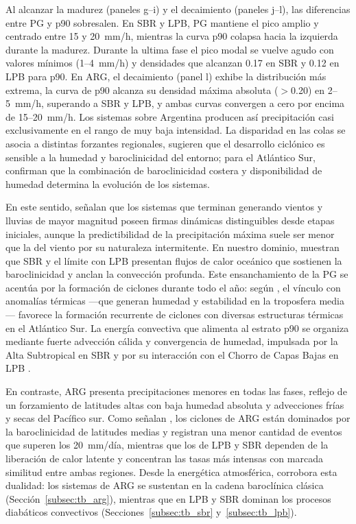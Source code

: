 Al alcanzar la madurez (paneles g--i) y el decaimiento (paneles j--l), las diferencias entre PG y p90 sobresalen. 
En SBR y LPB, PG mantiene el pico amplio y centrado entre 15 y 20~mm/h, mientras la curva p90 colapsa hacia la izquierda durante la madurez. 
Durante la ultima fase el pico modal se vuelve agudo con valores mínimos (1--4~mm/h) y densidades que alcanzan 0.17 en SBR y 0.12 en LPB para p90. 
En ARG, el decaimiento (panel l) exhibe la distribución más extrema, la curva de p90 alcanza su densidad máxima absoluta ($>$0.20) en 2--5~mm/h, superando a SBR y LPB, y ambas curvas convergen a cero por encima de 15--20~mm/h. 
Los sistemas sobre Argentina producen así precipitación casi exclusivamente en el rango de muy baja intensidad.
La disparidad en las colas se asocia a distintas forzantes regionales, \citet{yanase2014parameter} sugieren que el desarrollo ciclónico es sensible a la humedad y baroclinicidad del entorno; para el Atlántico Sur, \citet{gramcianinov2019properties} confirman que la combinación de baroclinicidad costera y disponibilidad de humedad determina la evolución de los sistemas.

En este sentido, \citet{laurila2021characteristics} señalan que los sistemas que terminan generando vientos y lluvias de mayor magnitud poseen firmas dinámicas distinguibles desde etapas iniciales, aunque la predictibilidad de la precipitación máxima suele ser menor que la del viento por su naturaleza intermitente. 
En nuestro dominio, \citet{russo2025impacts} muestran que SBR y el límite con LPB presentan flujos de calor oceánico que sostienen la baroclinicidad y anclan la convección profunda. Este ensanchamiento de la PG se acentúa por la formación de ciclones durante todo el año: según \citet{evans2012climatology}, el vínculo con anomalías térmicas —que generan humedad y estabilidad en la troposfera media— favorece la formación recurrente de ciclones con diversas estructuras térmicas en el Atlántico Sur. La energía convectiva que alimenta al estrato p90 se organiza mediante fuerte advección cálida y convergencia de humedad, impulsada por la Alta Subtropical en SBR y por su interacción con el Chorro de Capas Bajas en LPB \citep{gramcianinov2024early}.

En contraste, ARG presenta precipitaciones menores en todas las fases, reflejo de un forzamiento de latitudes altas con baja humedad absoluta y advecciones frías y secas del Pacífico sur. Como señalan \citet{gramcianinov2019properties}, los ciclones de ARG están dominados por la baroclinicidad de latitudes medias y registran una menor cantidad de eventos que superen los 20~mm/día, mientras que los de LPB y SBR dependen de la liberación de calor latente y concentran las tasas más intensas con marcada similitud entre ambas regiones. Desde la energética atmosférica, \citet{coutodesouza2024thesis} corrobora esta dualidad: los sistemas de ARG se sustentan en la cadena baroclínica clásica (Sección~\ref{subsec:tb_arg}), mientras que en LPB y SBR dominan los procesos diabáticos convectivos (Secciones~\ref{subsec:tb_sbr} y~\ref{subsec:tb_lpb}).

